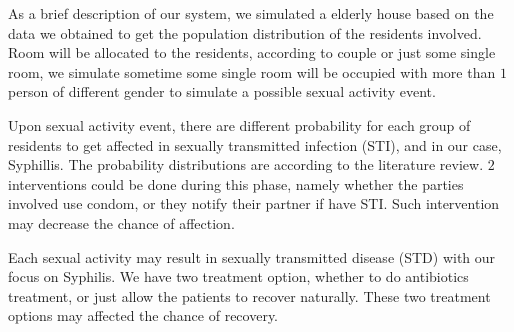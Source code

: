\documentclass{article}
\begin{document}
\begin{normalsize}
	As a brief description of our system, we simulated a elderly house based on the data we obtained to get the population distribution of the residents involved. Room will be allocated to the residents, according to couple or just some single room, we simulate sometime some single room will be occupied with more than $1$ person of different gender to simulate a possible sexual activity event.
	
	Upon sexual activity event, there are different probability for each group of residents to get affected in sexually transmitted infection (STI), and in our case, Syphillis. The probability distributions are according to the literature review. $2$ interventions could be done during this phase, namely whether the parties involved use condom, or they notify their partner if have STI. Such intervention may decrease the chance of affection.
	
	Each sexual activity may result in sexually transmitted disease (STD) with our focus on Syphilis. We have two treatment option, whether to do antibiotics treatment, or just allow the patients to recover naturally. These two treatment options may affected the chance of recovery.
	     

\end{normalsize}
\end{document}
